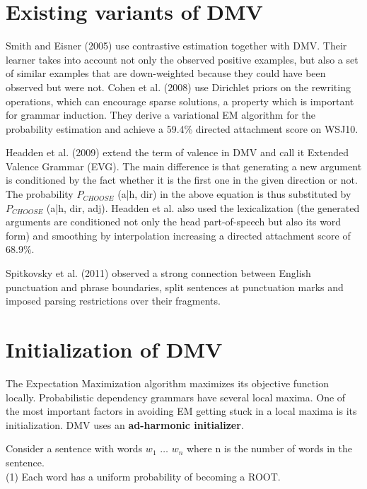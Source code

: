 \documentclass{article}
\begin{document}
\section{Existing variants of DMV}

   Smith and Eisner (2005) \cite{smith2005} use contrastive estimation together with DMV. Their learner takes into account not only the observed positive examples, but also a set of similar examples that are down-weighted because they could have been observed but were not. Cohen et al. (2008) \cite{cohen2008} use Dirichlet priors on the rewriting operations, which can encourage sparse solutions, a property which is important for grammar induction. They derive a variational EM algorithm for the probability estimation and achieve a 59.4\% directed attachment score on WSJ10. 

   Headden et al. (2009) \cite{headden2009} extend the term of valence in DMV and call it Extended Valence Grammar (EVG). The main difference is that generating a new argument is conditioned by the fact whether it is the first one in the given direction or not. The probability $P_{CHOOSE}$ (a|h, dir) in the above equation is thus substituted by $P_{CHOOSE}$ (a|h, dir, adj). Headden et al. also used the lexicalization (the generated arguments are conditioned not only the head part-of-speech but also its word form) and smoothing by interpolation increasing a directed attachment score of 68.9\%.

   Spitkovsky et al. (2011) \cite{spitkovsky2011b} observed a strong connection between English punctuation and phrase boundaries, split sentences at punctuation marks and imposed parsing restrictions over their fragments.

\section{Initialization of DMV}

The Expectation Maximization algorithm maximizes its objective function locally. Probabilistic dependency grammars have several local maxima. One of the most important factors in avoiding EM getting stuck in a local maxima is its initialization. DMV uses an \textbf{ad-harmonic initializer}. 

Consider a sentence with words $w_1$ $\ldots$ $w_n$ where n is the number of words in the sentence.\\

(1) Each word has a uniform probability of becoming a ROOT.
\end{document}
